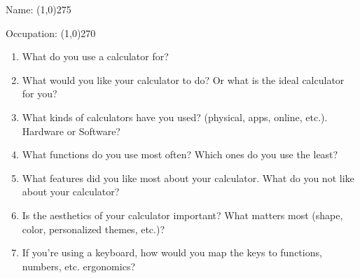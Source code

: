 \documentclass[12pt]{article}
\begin{document}

\begin{center}Name: \line(1,0){275} \end{center}
\begin{center}Occupation: \line(1,0){270} \end{center}


\begin{enumerate}

\item
What do you use a calculator for?

\item
What would you like your calculator to do? Or what is the ideal calculator for you?

\item
What kinds of calculators have you used? (physical, apps, online, etc.). Hardware or Software? 

\item
What functions do you use most often? Which ones do you use the least?

\item
What features did you like most about your calculator. What do you not like about your calculator?

\item
Is the aesthetics of your calculator important? What matters most (shape, color,  personalized themes, etc.)?

\item
If you’re using a keyboard, how would you map the keys to functions, numbers, etc. ergonomics?


\end{enumerate}
\end{document}
